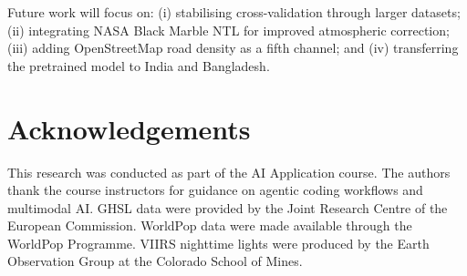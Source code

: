 \documentclass[conference]{IEEEtran}
\begin{document}
Future work will focus on: (i) stabilising cross-validation through larger datasets; (ii) integrating NASA Black Marble NTL for improved atmospheric correction; (iii) adding OpenStreetMap road density as a fifth channel; and (iv) transferring the pretrained model to India and Bangladesh.

\section*{Acknowledgements}

This research was conducted as part of the AI Application course. The authors thank the course instructors for guidance on agentic coding workflows and multimodal AI. GHSL data were provided by the Joint Research Centre of the European Commission. WorldPop data were made available through the WorldPop Programme. VIIRS nighttime lights were produced by the Earth Observation Group at the Colorado School of Mines.
\end{document}
